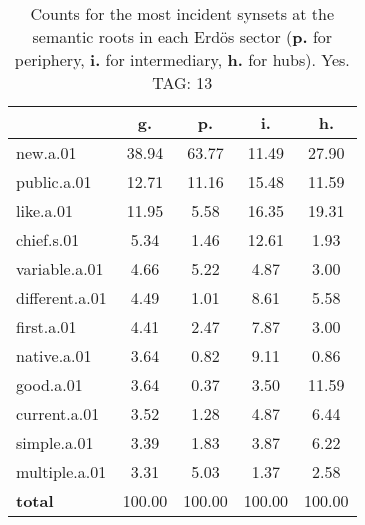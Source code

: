 \begin{table}[h!]
\begin{center}
\begin{tabular}{| l || c | c | c | c |}\hline
 & {\bf g.} & {\bf p.} & {\bf i.} & {\bf h.} \\\hline\hline
new.a.01 & 38.94  & 63.77  & 11.49  & 27.90 \\\hline
public.a.01 & 12.71  & 11.16  & 15.48  & 11.59 \\\hline
like.a.01 & 11.95  & 5.58  & 16.35  & 19.31 \\\hline
chief.s.01 & 5.34  & 1.46  & 12.61  & 1.93 \\\hline
variable.a.01 & 4.66  & 5.22  & 4.87  & 3.00 \\\hline
different.a.01 & 4.49  & 1.01  & 8.61  & 5.58 \\\hline
first.a.01 & 4.41  & 2.47  & 7.87  & 3.00 \\\hline
native.a.01 & 3.64  & 0.82  & 9.11  & 0.86 \\\hline
good.a.01 & 3.64  & 0.37  & 3.50  & 11.59 \\\hline
current.a.01 & 3.52  & 1.28  & 4.87  & 6.44 \\\hline
simple.a.01 & 3.39  & 1.83  & 3.87  & 6.22 \\\hline
multiple.a.01 & 3.31  & 5.03  & 1.37  & 2.58 \\\hline\hline
{{\bf total}} & 100.00  & 100.00  & 100.00  & 100.00 \\\hline
\end{tabular}
\caption{Counts for the most incident synsets at the semantic roots in each Erd\"os sector ({\bf p.} for periphery, {\bf i.} for intermediary, {\bf h.} for hubs). Yes. TAG: 13}
\end{center}
\end{table}